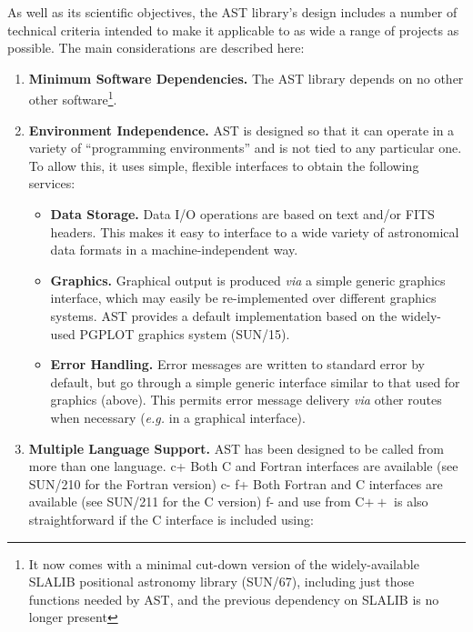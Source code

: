 \documentclass[twoside,11pt]{article}
\newcommand{\xref}[3]{#1}
\begin{document}
As well as its scientific objectives, the AST library's design
includes a number of technical criteria intended to make it applicable
to as wide a range of projects as possible. The main considerations
are described here:

\begin{enumerate}
\item {\bf{Minimum Software Dependencies.}}
The AST library depends on no other other software\footnote{It now comes with a
minimal cut-down version of the widely-available SLALIB positional astronomy 
library (\xref{SUN/67}{sun67}{}), including just those functions needed
by AST, and the previous dependency on SLALIB is no longer present}.

\item {\bf{Environment Independence.}}
AST is designed so that it can operate in a variety of ``programming
environments'' and is not tied to any particular one. To allow this,
it uses simple, flexible interfaces to obtain the following services:

\begin{itemize}
\item {\bf{Data Storage.}} Data I/O operations are based on text
and/or FITS headers. This makes it easy to interface to a wide variety
of astronomical data formats in a machine-independent way.

\item {\bf{Graphics.}} Graphical output is produced {\em{via}} a
simple generic graphics interface, which may easily be re-implemented
over different graphics systems. AST provides a default implementation
based on the widely-used PGPLOT graphics system
(\xref{SUN/15}{sun15}{}).

\item {\bf{Error Handling.}} Error messages are written to standard
error by default, but go through a simple generic interface similar to
that used for graphics (above). This permits error message delivery
{\em{via}} other routes when necessary ({\em{e.g.}} in a graphical
interface).
\end{itemize}

\item {\bf{Multiple Language Support.}}
AST has been designed to be called from more than one language.
c+
Both C and Fortran interfaces are available (see
\xref{SUN/210}{sun210}{} for the Fortran version)
c-
f+
Both Fortran and C interfaces are available (see
\xref{SUN/211}{sun211}{} for the C version)
f-
and use from C$++$ is also straightforward if the C interface is
included using:


\end{enumerate}
\end{document}

